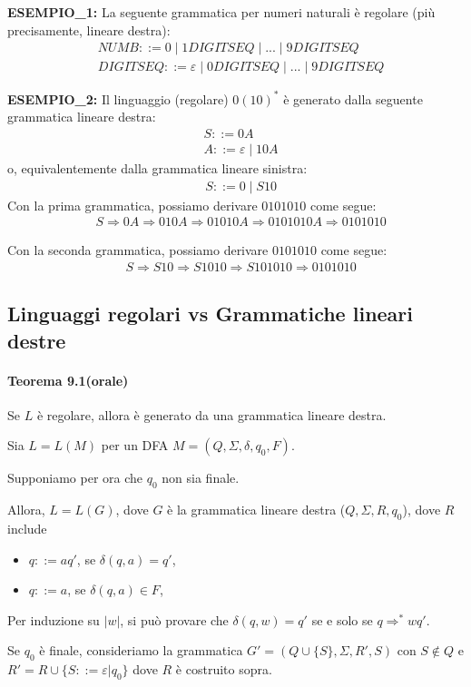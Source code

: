 \documentclass{article}
\begin{document}
\textbf{ESEMPIO\_1:} La seguente grammatica per numeri naturali è regolare (più precisamente, lineare destra):
\begin{align*}
    &NUMB ::= 0 \mid 1 DIGITSEQ \mid ... \mid 9 DIGITSEQ \\
    &DIGITSEQ ::= \varepsilon \mid 0 DIGITSEQ \mid ... \mid 9 DIGITSEQ
\end{align*}

\textbf{ESEMPIO\_2:} Il linguaggio (regolare) $0(10)^*$ è generato dalla seguente grammatica lineare destra:
\begin{align*}
    &S ::= 0A \\
    &A ::= \varepsilon \mid 10A
\end{align*}
o, equivalentemente dalla grammatica lineare sinistra:
\begin{align*}
    &S ::= 0 \mid S10
\end{align*}
Con la prima grammatica, possiamo derivare $0101010$ come segue:
\begin{align*}
    &S \Rightarrow 0A \Rightarrow 010A \Rightarrow 01010A \Rightarrow 0101010A \Rightarrow 0101010
\end{align*}

Con la seconda grammatica, possiamo derivare $0101010$ come segue:
\begin{align*}
    &S \Rightarrow S10 \Rightarrow S1010 \Rightarrow S101010 \Rightarrow 0101010
\end{align*}

\subsection{Linguaggi regolari vs Grammatiche lineari destre}

\paragraph{Teorema 9.1(orale)}
\label{teorema-9.1}
\text{}
\newline
Se $L$ è regolare, allora è generato da una grammatica lineare destra.

\begin{tcolorbox}[colback=yellow!10!white, colframe=yellow!50!black, title=Dimostrazione]
    Sia $L = L(M)$ per un DFA $M = (Q,\Sigma,\delta,q_0,F)$.

    Supponiamo per ora che $q_0$ non sia finale.

    Allora, $L = L(G)$, dove $G$ è la grammatica lineare destra ($Q,\Sigma,R,q_0$), dove $R$ include
    \begin{itemize}
        \item $q ::= aq'$, se $\delta(q,a) = q'$,
        \item $q ::= a$, se $\delta(q,a) \in F$,
    \end{itemize}
    Per induzione su $|w|$, si può provare che $\delta(q,w) = q'$ se e solo se $q \Rightarrow^* wq'$.

    Se $q_0$ è finale, consideriamo la grammatica $G' = (Q \cup \{S\}, \Sigma, R', S)$ con $S \notin Q$ e $R' = R \cup \{ S ::= \varepsilon | q_0 \}$ dove $R$ è costruito sopra.
\end{tcolorbox}
\end{document}
